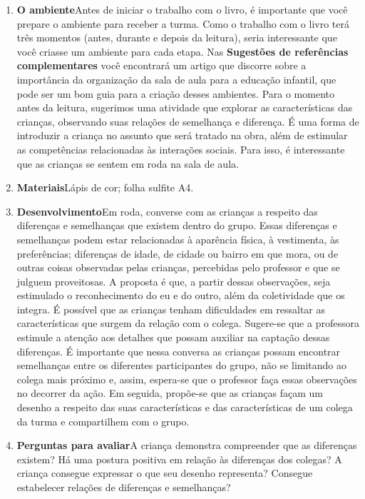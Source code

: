 \documentclass[11pt]{extarticle}
\begin{document}
\begin{enumerate}
\item \textbf{O ambiente}\quad Antes de iniciar o trabalho com o livro, é importante que você 
prepare o ambiente para receber a turma. Como o trabalho com o livro terá 
três momentos (antes, durante e depois da leitura), seria interessante que você 
criasse um ambiente para cada etapa. Nas \textbf{Sugestões de referências complementares} 
você encontrará um artigo que discorre sobre a importância da organização da sala 
de aula para a educação infantil, que pode ser um bom guia para a criação desses 
ambientes.
Para o momento antes da leitura, sugerimos uma atividade que explorar as características das crianças, observando suas relações de semelhança e diferença. É uma forma de introduzir a criança no assunto que será tratado na obra, além de estimular as competências relacionadas às interações sociais. Para isso, é interessante que as crianças se sentem em roda na sala de aula.

\item \textbf{Materiais}\quad Lápis de cor; folha sulfite A4. 

\item \textbf{Desenvolvimento}\quad Em roda, converse com as crianças a respeito das diferenças e semelhanças que existem dentro do grupo. Essas diferenças e semelhanças podem estar relacionadas à aparência física, à vestimenta, às preferências; diferenças de idade, de cidade ou bairro em que mora, ou de outras coisas observadas pelas crianças, percebidas pelo professor e que se julguem proveitosas. A proposta é que, a partir dessas observações, seja estimulado o reconhecimento do eu e do outro, além da coletividade que os integra. É possível que as crianças tenham dificuldades em ressaltar as características que surgem da relação com o colega. Sugere-se que a professora estimule a atenção aos detalhes que possam auxiliar na captação dessas diferenças. É importante que nessa conversa as crianças possam encontrar semelhanças entre os diferentes participantes do grupo, não se limitando ao colega mais próximo e, assim, espera-se que o professor faça essas observações no decorrer da ação. Em seguida, propõe-se que as crianças façam um desenho a respeito das suas características e das características de um colega da turma e compartilhem com o grupo.    

\item \textbf{Perguntas para avaliar}\quad A criança demonstra compreender que as diferenças existem? Há uma postura positiva em relação às diferenças dos colegas? A criança consegue expressar o que seu desenho representa? Consegue estabelecer relações de diferenças e semelhanças? 

\end{enumerate}
\end{document}
